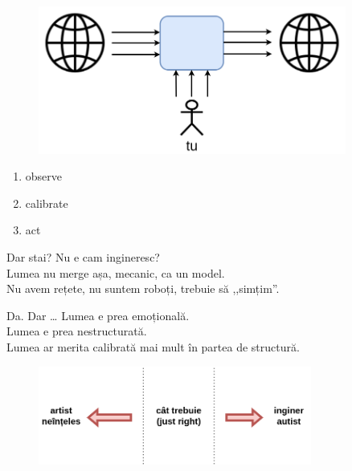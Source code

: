 \documentclass{simple}
\begin{document}
\begin{frame}{}
  \begin{figure}
    \centering
    \includegraphics[width=0.9\textwidth]{img/calibration-input-output.png}
  \end{figure}
\end{frame}

\begin{frame}{}
  \begin{enumerate}
    \pause \item observe
    \pause \item calibrate
    \pause \item act
  \end{enumerate}
\end{frame}

\begin{frame}{Dar stai?}
  \centering
  \pause Nu e cam ingineresc? \\
  \vspace{3mm}
  \pause Lumea nu merge așa, mecanic, ca un model. \\
  \vspace{3mm}
  \pause Nu avem rețete, nu suntem roboți, trebuie să ,,simțim''.
\end{frame}

\begin{frame}{Da. Dar \ldots{}}
  \centering
  \pause Lumea e prea emoțională. \\
  \vspace{3mm}
  \pause Lumea e prea nestructurată. \\
  \vspace{3mm}
  \pause Lumea ar merita calibrată mai mult în partea de structură.
\end{frame}

\begin{frame}{}
  \begin{figure}
    \centering
    \includegraphics[width=0.8\textwidth]{img/inginer-artist.png}
  \end{figure}
\end{frame}
\end{document}
